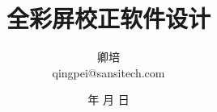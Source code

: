 \documentclass[12pt,a4paper]{article}
\renewcommand{\today}{\number\year 年 \number\month 月 \number\day 日} %
\numberwithin{equation}{section}
\theoremstyle{plain}
\theoremstyle{definition}
\begin{document}
\title{\textbf{全彩屏校正软件设计}}

\author{卿培\\
        qingpei@sansitech.com
}

\date{\today}

\maketitle
\clearpage

\tableofcontents
\clearpage
\listoftodos





% 

\end{document}

